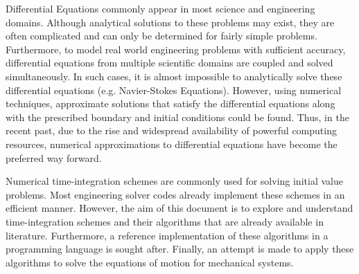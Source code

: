 Differential Equations commonly appear in most science and engineering domains. Although analytical solutions to these problems may exist, they are often complicated and can only be determined for fairly simple problems. Furthermore, to model real world engineering problems with sufficient accuracy, differential equations from multiple scientific domains are coupled and solved simultaneously. In such cases, it is almost impossible to analytically solve these differential equations (e.g. Navier-Stokes Equations). However, using numerical techniques, approximate solutions that satisfy the differential equations along with the prescribed boundary and initial conditions could be found. Thus, in the recent past, due to the rise and widespread availability of powerful computing resources, numerical approximations to differential equations have become the preferred way forward.

Numerical time-integration schemes are commonly used for solving initial value problems. Most engineering solver codes already implement these schemes in an efficient manner. However, the aim of this document is to explore and understand time-integration schemes and their algorithms that are already available in literature. Furthermore, a reference implementation of these algorithms in a programming language is sought after. Finally, an attempt is made to apply these algorithms to solve the equations of motion for mechanical systems.

